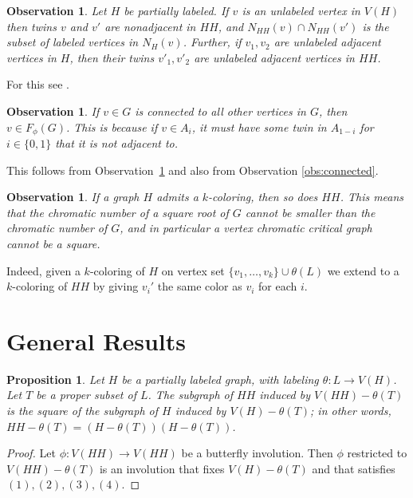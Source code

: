 \documentclass{article}
\newtheorem{proposition}[theorem]{Proposition}
\newtheorem{observation}[theorem]{Observation}
\theoremstyle{definition}
\begin{document}
\begin{observation} \rm \label{obs:twin} 
Let $H$ be partially labeled. If $v$ is an unlabeled vertex in $V(H)$ then twins $v$ and $v'$ are nonadjacent in $HH$, and $N_{HH}(v)\cap N_{HH}(v')$ is the subset of labeled vertices in $N_H(v)$. Further, if $v_1, v_2$ are unlabeled adjacent vertices in $H$, then their twins $v'_1,v'_2$ are unlabeled adjacent vertices in $HH$.
\end{observation}
\noindent For this see \cite[Lemma 2.1 and ensuing discussion]{AAP}.

\begin{observation} \rm \label{obs:dominating}
    If $v \in G$ is connected to all other vertices in $G$, then $v \in F_\phi(G)$. This is because if $v \in A_i$, it must have some twin in $A_{1-i}$ for $i \in \{0,1\}$ that it is not adjacent to. 
\end{observation}
\noindent This follows from Observation~\ref{obs:twin} and also from Observation \ref{obs:connected}.

\begin{observation} \rm \label{obs:chromatic_critical}
If a graph $H$ admits a $k$-coloring, then so does $HH$. This means that the chromatic number of a square root of $G$ cannot be smaller than the chromatic number of $G$, and in particular a vertex chromatic critical graph cannot be a square.     
\end{observation}
\noindent Indeed, given a $k$-coloring of $H$ on vertex set $\{v_1, \ldots, v_k\} \cup \theta(L)$ we extend to a $k$-coloring of $HH$ by giving $v_i'$ the same color as $v_i$ for each $i$.


\section{General Results} \label{sec:general}

\begin{proposition} \label{prop:smaller-L} Let $H$ be a partially labeled graph, with labeling $\theta:L\rightarrow V(H)$. Let $T$ be a proper subset of $L$. The subgraph of $HH$ induced by $V(HH)-\theta(T)$ is the square of the subgraph of $H$ induced by $V(H)-\theta(T)$; in other words, $HH-\theta(T)=(H-\theta(T))(H-\theta(T))$.
\end{proposition}

\begin{proof}
Let $\phi:V(HH)\rightarrow V(HH)$ be a butterfly involution. 
Then $\phi$ restricted to $V(HH)-\theta(T)$ is an involution that fixes $V(H)-\theta(T)$ and that satisfies $(1), (2), (3), (4)$.
\end{proof}
\end{document}
